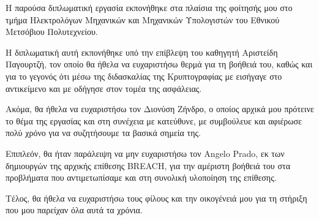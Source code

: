 \begin{acknowledgementsgr}
Η παρούσα διπλωματική εργασία εκπονήθηκε στα πλαίσια της φοίτησής μου στο τμήμα
Ηλεκτρολόγων Μηχανικών και Μηχανικών Υπολογιστών του Εθνικού Μετσόβιου
Πολυτεχνείου.

Η διπλωματική αυτή εκπονήθηκε υπό την επίβλεψη του καθηγητή Αριστείδη Παγουρτζή,
τον οποίο θα ήθελα να ευχαριστήσω θερμά για τη βοήθειά του, καθώς και για το
γεγονός ότι μέσω της διδασκαλίας της Κρυπτογραφίας με εισήγαγε στο αντικείμενο
και με οδήγησε στον τομέα της ασφάλειας.

Ακόμα, θα ήθελα να ευχαριστήσω τον Διονύση Ζήνδρο, ο οποίος αρχικά μου πρότεινε
το θέμα της εργασίας και στη συνέχεια με κατεύθυνε, με συμβούλευε και αφιέρωσε
πολύ χρόνο για να συζητήσουμε τα βασικά σημεία της.

Επιπλεόν, θα ήταν παράλειψη να μην ευχαριστήσω τον Angelo Prado, εκ των
δημιουργών της αρχικής επίθεσης BREACH, για την αμέριστη βοήθειά του στα
προβλήματα που αντιμετωπίσαμε και στη συνολική υλοποίηση της επίθεσης.

Τέλος, θα ήθελα να ευχαριστήσω τους φίλους και την οικογένειά μου για τη στήριξη
που μου παρείχαν όλα αυτά τα χρόνια.

\end{acknowledgementsgr}
